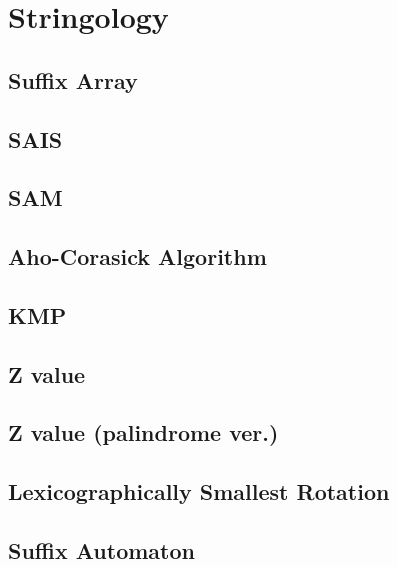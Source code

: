 \documentclass[a4paper,10pt,twocolumn,oneside]{article}
\begin{document}
\section{Stringology}

\subsection{Suffix Array}


\subsection{SAIS}


\subsection{SAM}


\subsection{Aho-Corasick Algorithm}


\subsection{KMP}


\subsection{Z value}


\subsection{Z value (palindrome ver.)}


\subsection{Lexicographically Smallest Rotation}


\subsection{Suffix Automaton}

\end{document}
